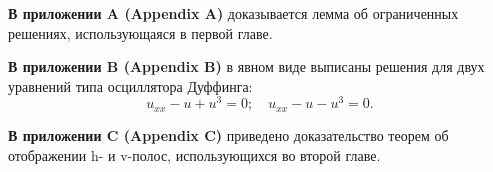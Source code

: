 \documentclass[candidate, href, colorlinks]{disser}
\begin{document}
\textbf{В приложении A (Appendix A)} доказывается лемма об ограниченных решениях, использующаяся в первой главе.

\textbf{В приложении B (Appendix B)} в явном виде выписаны решения для двух уравнений типа осциллятора Дуффинга: 
\begin{equation}
	u_{xx} - u + u^3 = 0; \quad u_{xx} - u - u^3 = 0.
\end{equation}

\textbf{В приложении C (Appendix C)} приведено доказательство теорем об отображении h- и v-полос, использующихся во второй главе.


\def\thispagestyle#1{}
\renewcommand{\bibname}{\protect\leftline{\large Список публикаций автора по теме диссертации}}
\printbibliography[keyword=own]


\end{document}
